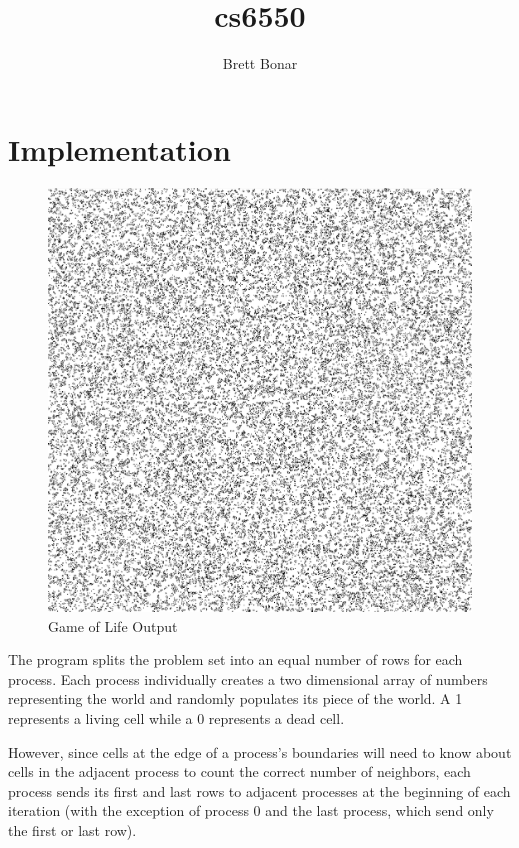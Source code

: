 \documentclass{article}
\title{cs6550}
\author{ Brett Bonar }
\begin{document}
\maketitle

\section{Implementation}

\begin{figure}
	\includegraphics[width=\linewidth]{0.png}
	\caption{Game of Life Output}
	\label{fig:output}
\end{figure}

The program splits the problem set into an equal number of rows for each process. Each process individually creates a two dimensional array of numbers representing the world and randomly populates its piece of the world. A 1 represents a living cell while a 0 represents a dead cell.

However, since cells at the edge of a process's boundaries will need to know about cells in the adjacent process to count the correct number of neighbors, each process sends its first and last rows to adjacent processes at the beginning of each iteration (with the exception of process 0 and the last process, which send only the first or last row).
\end{document}
